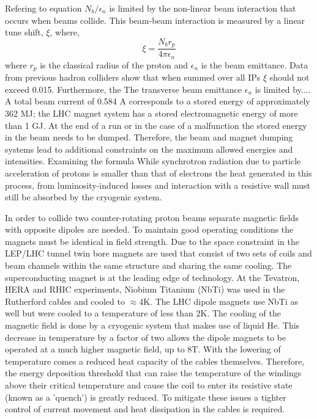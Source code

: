 Refering to equation %
$N_{b}/\epsilon_{n}$ is limited by the %
non-linear beam interaction that occurs when beams collide. This
beam-beam interaction is measured by a linear tune shift, $\xi$, where,
\begin{equation}
\xi=\frac{N_{b}r_{p}}{4\pi\epsilon_{n}}
\end{equation}
where $r_{p}$ is the classical radius of the proton
and $\epsilon_{n}$ is the beam emittance.
Data from previous hadron colliders show that when summed over
all IPs $\xi$ should not exceed 0.015. %
Furthermore, the %
The transverse beam emittance $\epsilon_{n}$ is limited by.... 
A total beam current of 0.584 A corresponds to a stored energy
of approximately 362 MJ; the LHC magnet system has a stored
electromagnetic energy of more than 1 GJ.
At the end of a run or in the case of a malfunction the stored
energy in the beam needs to be dumped. Therefore, the beam
and magnet dumping systems lead to additional constraints
on the maximum allowed energies and intensities.
Examining the formula
While synchrotron radiation due to particle acceleration of protons%
is smaller than that of electrons the heat generated in this process,
 from luminosity-induced losses and interaction with a resistive wall
must still be absorbed by the cryogenic system. 

In order to collide two counter-rotating proton beams separate magnetic fields
with opposite dipoles are needed. To maintain good operating conditions
the magnets must be identical in field strength. 
Due to the space constraint in the LEP/LHC
tunnel twin bore magnets are used that consist of two sets of 
coils and beam channels within the same structure and
sharing the same cooling. 
The superconducting magnet is at the leading edge of technology.
At the Tevatron, HERA and RHIC experiments, Niobium Titanium (NbTi)
was used in the Rutherford cables and cooled to $\approx$4K. 
The LHC dipole magnets use NbTi as well but were cooled
to a temperature of less than 2K. 
The cooling of the magnetic field is done%
by a cryogenic system that makes use of liquid He.
This decrease in temperature
by a factor of two allows the dipole magnets to be operated 
at a much higher magnetic field, up to 8T. With the lowering of
temperature comes a reduced heat capacity of the cables themselves.
Therefore, the energy deposition threshold that can raise the 
temperature of the windings above their critical temperature and
cause the coil to enter its resistive state (known as a 'quench') is greatly
reduced. To mitigate these issues a tighter control of current movement
and heat dissipation in the cables is required. 


